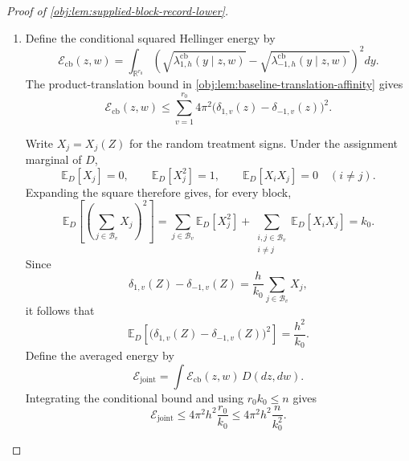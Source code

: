 \documentclass[11pt]{article}
\begin{document}
\begin{proof}[Proof of \cref{obj:lem:supplied-block-record-lower}]
\begin{enumerate}
\item Define the conditional squared Hellinger energy by
\[
\mathcal E_{\mathrm{cb}}(z,w)
=
\int_{\mathbb R^{r_0}}
\left(
\sqrt{\lambda^{\mathrm{cb}}_{1,h}(y\mid z,w)}
-
\sqrt{\lambda^{\mathrm{cb}}_{-1,h}(y\mid z,w)}
\right)^2dy.
\]
The product-translation bound in
\cref{obj:lem:baseline-translation-affinity} gives
\[
\mathcal E_{\mathrm{cb}}(z,w)
\le
\sum_{v=1}^{r_0}
4\pi^2
\bigl(\delta_{1,v}(z)-\delta_{-1,v}(z)\bigr)^2.
\]

Write \(X_j=X_j(Z)\) for the random treatment signs. Under the assignment marginal of \(D\),
\[
\mathbb E_D[X_j]=0,
\qquad
\mathbb E_D[X_j^2]=1,
\qquad
\mathbb E_D[X_iX_j]=0\quad(i\ne j).
\]
Expanding the square therefore gives, for every block,
\[
\mathbb E_D
\left[\left(\sum_{j\in\mathcal B_v}X_j\right)^2\right]
=
\sum_{j\in\mathcal B_v}\mathbb E_D[X_j^2]
+
\sum_{\substack{i,j\in\mathcal B_v\\i\ne j}}
\mathbb E_D[X_iX_j]
=k_0.
\]
Since
\[
\delta_{1,v}(Z)-\delta_{-1,v}(Z)
=
\frac{h}{k_0}\sum_{j\in\mathcal B_v}X_j,
\]
it follows that
\[
\mathbb E_D
\left[
\bigl(\delta_{1,v}(Z)-\delta_{-1,v}(Z)\bigr)^2
\right]
=
\frac{h^2}{k_0}.
\]
Define the averaged energy by
\[
\mathcal E_{\mathrm{joint}}
=
\int\mathcal E_{\mathrm{cb}}(z,w)\,D(dz,dw).
\]
Integrating the conditional bound and using \(r_0k_0\le n\) gives
\[
\mathcal E_{\mathrm{joint}}
\le
4\pi^2h^2\frac{r_0}{k_0}
\le
4\pi^2h^2\frac{n}{k_0^2}.
\]


\end{enumerate}
\end{proof}
\end{document}
